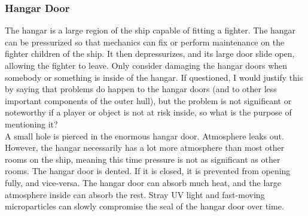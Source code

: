 \documentclass[a4paper]{article}
\begin{document}
\vspace{-0.5cm} \hspace{-18pt} \subsubsection{Hangar Door} \label{outer_hangar} \vspace{-0.2cm}
The hangar is a large region of the ship capable of fitting a fighter. The hangar can be pressurized so that mechanics can fix or perform maintenance on the fighter children of the ship. It then depressurizes, and its large door slide open, allowing the fighter to leave. Only consider damaging the hangar doors when somebody or something is inside of the hangar. If questioned, I would justify this by saying that problems do happen to the hangar doors (and to other less important components of the outer hull), but the problem is not significant or noteworthy if a player or object is not at risk inside, so what is the purpose of mentioning it?
\\ \pbhw
{A small hole is pierced in the enormous hangar door. Atmosphere leaks out. However, the hangar necessarily has a lot more atmosphere than most other rooms on the ship, meaning this time pressure is not as significant as other rooms.}
{The hangar door is dented. If it is closed, it is prevented from opening fully, and vice-versa.}
{The hangar door can absorb much heat, and the large atmosphere inside can absorb the rest.}
{Stray UV light and fast-moving microparticles can slowly compromise the seal of the hangar door over time.}
\end{document}

